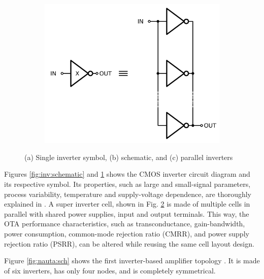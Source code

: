 \documentclass[conference]{IEEEtran}
\begin{document}
\begin{figure}[htbp]
\begin{subfigure}[b]{0.49\columnwidth}
		\caption{}
		\label{fig:inv:symbol}
	\end{subfigure}\\
	\begin{subfigure}[b]{0.49\columnwidth}
		\centerline{\includegraphics[scale=0.50]{circuits/inv_parallel.pdf}}
		\caption{}
		\label{fig:inv:parallel}
	\end{subfigure}
	
	\caption{(a) Single inverter symbol, (b) schematic, and (c) parallel inverters}
	\label{fig:inv:sch}
\end{figure}

Figures \ref{fig:inv:schematic} and  \ref{fig:inv:symbol} shows the CMOS inverter circuit diagram and its respective symbol. Its properties, such as large and small-signal parameters, process variability, temperature and supply-voltage dependence, are thoroughly explained in \cite{rodovalho2021push}. A super inverter cell, shown in Fig. \ref{fig:inv:parallel} is made of multiple cells in parallel with shared power supplies, input and output terminals. This way, the OTA performance characteristics, such as transconductance, gain-bandwidth, power consumption, common-mode rejection ratio (CMRR), and power supply rejection ratio (PSRR), can be altered while reusing the same cell layout design.

Figure \ref{fig:nauta:sch} shows the first inverter-based amplifier topology \cite{nauta1992cmos}. It is made of six inverters, has only four nodes, and is completely symmetrical.
\end{document}
